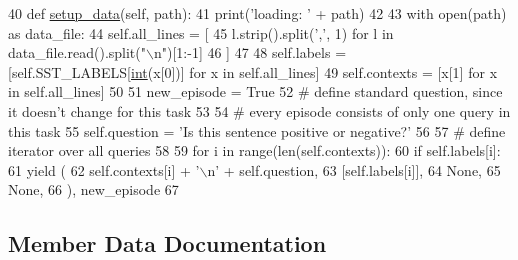 \begin{DoxyCode}
40     \textcolor{keyword}{def }\hyperlink{namespaceparlai_1_1tasks_1_1multinli_1_1agents_a4fa2cb0ba1ed745336ad8bceed36b841}{setup\_data}(self, path):
41         print(\textcolor{stringliteral}{'loading: '} + path)
42 
43         with open(path) \textcolor{keyword}{as} data\_file:
44             self.all\_lines = [
45                 l.strip().split(\textcolor{stringliteral}{','}, 1) \textcolor{keywordflow}{for} l \textcolor{keywordflow}{in} data\_file.read().split(\textcolor{stringliteral}{"\(\backslash\)n"})[1:-1]
46             ]
47 
48             self.labels = [self.SST\_LABELS[\hyperlink{namespacelanguage__model_1_1eval__ppl_a7d12ee00479673c5c8d1f6d01faa272a}{int}(x[0])] \textcolor{keywordflow}{for} x \textcolor{keywordflow}{in} self.all\_lines]
49             self.contexts = [x[1] \textcolor{keywordflow}{for} x \textcolor{keywordflow}{in} self.all\_lines]
50 
51         new\_episode = \textcolor{keyword}{True}
52         \textcolor{comment}{# define standard question, since it doesn't change for this task}
53 
54         \textcolor{comment}{# every episode consists of only one query in this task}
55         self.question = \textcolor{stringliteral}{'Is this sentence positive or negative?'}
56 
57         \textcolor{comment}{# define iterator over all queries}
58 
59         \textcolor{keywordflow}{for} i \textcolor{keywordflow}{in} range(len(self.contexts)):
60             \textcolor{keywordflow}{if} self.labels[i]:
61                 \textcolor{keywordflow}{yield} (
62                     self.contexts[i] + \textcolor{stringliteral}{'\(\backslash\)n'} + self.question,
63                     [self.labels[i]],
64                     \textcolor{keywordtype}{None},
65                     \textcolor{keywordtype}{None},
66                 ), new\_episode
67 
\end{DoxyCode}


\subsection{Member Data Documentation}
\mbox{\label{classparlai_1_1tasks_1_1sst_1_1agents_1_1SSTTeacher_a555e131fc76d2c8b1ac08171f677e969}} 
